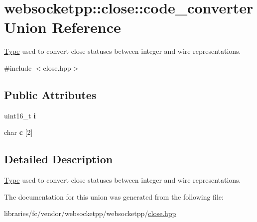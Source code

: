 \hypertarget{unionwebsocketpp_1_1close_1_1code__converter}{}\section{websocketpp\+:\+:close\+:\+:code\+\_\+converter Union Reference}
\label{unionwebsocketpp_1_1close_1_1code__converter}


\mbox{\hyperlink{struct_type}{Type}} used to convert close statuses between integer and wire representations.  




{\ttfamily \#include $<$close.\+hpp$>$}

\subsection*{Public Attributes}
\begin{DoxyCompactItemize}
\item 
\mbox{\label{unionwebsocketpp_1_1close_1_1code__converter_aa8ed980b85e36e51a24f7eb95c2c3bf7}} 
uint16\+\_\+t {\bfseries i}
\item 
\mbox{\label{unionwebsocketpp_1_1close_1_1code__converter_ad9a9b5ad77cd94c1ac521a3524e42962}} 
char {\bfseries c} \mbox{[}2\mbox{]}
\end{DoxyCompactItemize}


\subsection{Detailed Description}
\mbox{\hyperlink{struct_type}{Type}} used to convert close statuses between integer and wire representations. 

The documentation for this union was generated from the following file\+:\begin{DoxyCompactItemize}
\item 
libraries/fc/vendor/websocketpp/websocketpp/\mbox{\hyperlink{close_8hpp}{close.\+hpp}}\end{DoxyCompactItemize}
